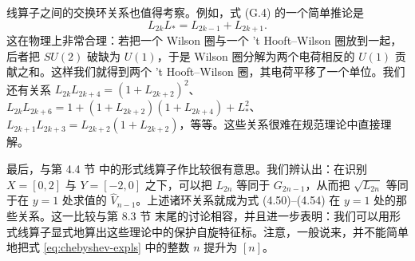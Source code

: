线算子之间的交换环关系也值得考察。例如，式 (G.4)%
的一个简单推论是
%
\begin{equation} L_{2k} L_* = L_{2k-1} + L_{2k+1}. \end{equation}
%
这在物理上非常合理：若把一个 Wilson 圈与一个 't Hooft--Wilson 圈放到一起，后者把 $SU(2)$ 破缺为 $U(1)$，于是 Wilson 圈分解为两个电荷相反的 $U(1)$ 贡献之和。这样我们就得到两个 't Hooft--Wilson 圈，其电荷平移了一个单位。我们还有关系 $L_{2k} L_{2k+4} = (1+L_{2k+2})^2$、$L_{2k} L_{2k+6} = 1+(1+ L_{2k+2})(1 + L_{2k+4}) + L_*^2$、$L_{2k+1} L_{2k+3} = L_{2k+2} (1+L_{2k+2})$，等等。这些关系很难在规范理论中直接理解。

最后，与第 4.4 节%
中的形式线算子作比较很有意思。我们辨认出：在识别 $X=[0,2]$ 与 $Y=[-2,0]$ 之下，可以把 $L_{2n}$ 等同于 $G_{2n-1}$，从而把 $\sqrt{L_{2n}}$ 等同于在 $y=1$ 处求值的 $\hat V_{n-1}$。上述诸环关系就成为式 (4.50)--(4.54)%
在 $y=1$ 处的那些关系。这一比较与第 8.3 节%
末尾的讨论相容，并且进一步表明：我们可以用形式线算子显式地算出这些理论中的保护自旋特征标。注意，一般说来，并不能简单地把式 \eqref{eq:chebyshev-expls} 中的整数 $n$ 提升为 $[n]$。
